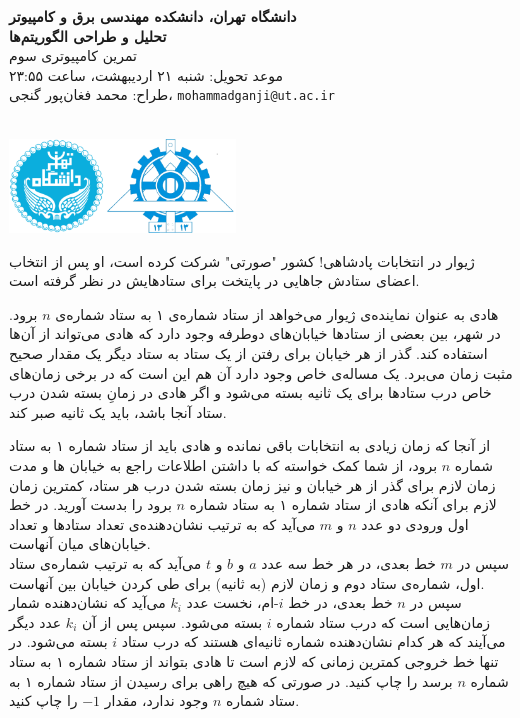 \documentclass[11.5pt,a4paper,oneside]{article}
\makeatletter
\renewcommand{\contestname}{
دانشگاه تهران، دانشکده مهندسی برق و کامپیوتر \\
تحلیل و طراحی الگوریتم‌ها \\
}
\renewcommand{\contestauthor}{
تمرین کامپیوتری سوم \\ موعد تحویل: شنبه ۲۱ اردیبهشت، ساعت ۲۳:۵۵ \\ طراح:‌ محمد فغان‌پور گنجی،
\texttt{mohammadganji@ut.ac.ir}
}
\makeatother
\begin{document}
{\noindent \Large \bf \contestname}
{\contestauthor}

\begin{flushleft}
\nothing\\[-3.2cm]
\includegraphics[height=2.5cm]{../../../../static/pics/ut-eng.png}
\end{flushleft}

\def\problemCode{Election}
\def\problemEnglishTitle{Election}
\def\problemFarsiTitle{انتخابات}
\def\timeLimit{$2$ \second}
\def\memLimit{$256$ \megabytes}
\begin{problem}
ژیوار در انتخابات پادشاهی! کشور "صورتی" شرکت کرده است، او پس از انتخاب اعضای ستادش جاهایی در پایتخت برای ستادهایش در نظر گرفته است.

هادی به عنوان نماینده‌ی ژیوار می‌خواهد از ستاد شماره‌ی ۱ به ستاد شماره‌ی $n$ برود. در شهر، بین بعضی از ستاد‌ها خیابان‌های دوطرفه وجود دارد که هادی می‌تواند از آن‌ها استفاده کند. گذر از هر خیابان برای رفتن از یک ستاد به ستاد دیگر یک مقدار صحیح مثبت زمان می‌برد. یک مساله‌ی خاص وجود دارد آن هم این است که در برخی زمان‌های خاص درب ستاد‌ها برای یک ثانیه بسته می‌شود و اگر هادی در زمانِ بسته شدن درب ستاد آنجا باشد، باید یک ثانیه صبر کند.

از آنجا که زمان زیادی به انتخابات باقی نمانده و هادی باید از ستاد شماره ۱ به ستاد شماره $n$ برود، از شما کمک خواسته که با داشتن اطلاعات راجع به خیابان ها و مدت زمان لازم برای گذر از هر خیابان و نیز زمان بسته شدن درب هر ستاد، کمترین زمان لازم برای آنکه هادی از ستاد شماره ۱ به ستاد شماره $n$ برود را بدست آورید.
در خط اول ورودی  دو عدد $n$ و $m$ می‌آید که به ترتیب نشان‌دهنده‌ی تعداد ستاد‌ها و تعداد خیابان‌های میان آنهاست.\\
سپس در $m$ خط بعدی، در هر خط سه عدد $a$ و $b$ و $t$ می‌آید که به ترتیب شماره‌ی ستاد اول، شماره‌ی ستاد دوم و زمان لازم (به ثانیه) برای طی کردن خیابان بین آنهاست.\\
سپس در $n$ خط بعدی، در خط $i$-ام، نخست عدد
$k_{i}$
می‌آید که نشان‌دهنده شمار زمان‌هایی است که درب ستاد شماره $i$ بسته می‌شود. سپس پس از آن 
$k_{i}$
عدد دیگر می‌آیند که هر کدام نشان‌دهنده شماره ثانیه‌ای هستند که درب ستاد $i$ بسته می‌شود.
\outputDescription
در تنها خط خروجی کمترین زمانی که لازم است تا هادی بتواند از ستاد شماره ۱ به ستاد شماره $n$ برسد را چاپ کنید.
در صورتی که هیچ راهی برای رسیدن از ستاد شماره ۱ به ستاد شماره $n$ وجود ندارد، مقدار $-1$ را چاپ کنید.


\end{problem}
\end{document}
